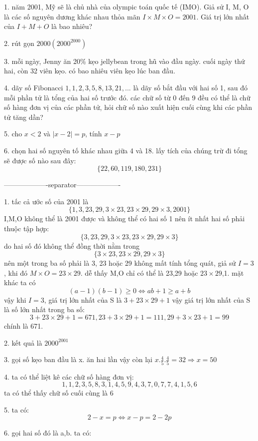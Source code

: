 \documentclass{article}
\begin{document}
1. năm 2001, Mỹ sẽ là chủ nhà của olympic toán quốc tế (IMO). 
Giả sử I, M, O là các số nguyên dương khác nhau thỏa mãn $I\times M \times O=2001$. 
Giá trị lớn nhất của $I+M+O$ là bao nhiêu?

2. rút gọn $2000(2000^{2000})$

3. mỗi ngày, Jenny ăn 20\% kẹo jellybean trong hũ vào đầu ngày. cuối ngày thứ hai, còn 32 viên kẹo.
có bao nhiêu viên kẹo lúc ban đầu.

4. dãy số Fibonacci $1,1,2,3,5,8,13,21,...$ là dãy số bắt đầu với hai số 1, sau đó mỗi phần tử là tổng của hai số trước đó.
các chữ số từ 0 đến 9 đều có thể là chữ số hàng đơn vị của các phần tử, hỏi chữ số nào xuất hiện cuối cùng khi các phần tử tăng dần?

5. cho $x<2$ và $|x-2|=p$, tính $x-p$

6. chọn hai số nguyên tố khác nhau giữa 4 và 18. lấy tích của chúng trừ đi tổng sẽ được số nào sau đây:
\[\{22,60,119,180,231\}\]

-------------------separator-------------------

1. tấc cả ước số của 2001 là
\[\{1, 3, 23, 29, 3\times 23, 23\times 29, 29\times 3, 2001\}\]
I,M,O không thể là 2001 được và không thể có hai số 1 nên ít nhất hai số phải thuộc tập hợp:
\[\{3, 23, 29, 3\times 23, 23\times 29, 29\times 3\}\]
do hai số đó không thể đồng thời nằm trong 
\[\{3\times 23, 23\times 29, 29\times 3\}\]
nên một trong ba số phải là 3, 23 hoặc 29
\newline
không mất tính tổng quát, giả sử $I=3$, khi đó $M\times O=23\times 29$.
dễ thấy M,O chỉ có thể là 23,29 hoặc $23\times 29$,1. mặt khác ta có
\[(a-1)(b-1)\geq 0 \Leftrightarrow ab+1 \geq a+b\]
vậy khi $I=3$, giá trị lớn nhất của S là $3+23\times 29 + 1$
vậy giá trị lớn nhất của S là số lớn nhất trong ba số:
\[3+23\times 29 + 1=671, 23 + 3 \times 29+1= 111, 29 + 3 \times 23+1=99\]
chính là 671.

2. kết quả là $2000^{2001}$

3. gọi số kẹo ban đầu là x. ăn hai lần vậy còn lại $x.\frac{4}{5}.\frac{4}{5}=32 \Rightarrow x=50$

4. ta có thể liệt kê các chữ số hàng đơn vị:
\[1,1,2,3,5,8,3,1,4,5,9,4,3,7,0,7,7,4,1,5,6\]
ta có thể thấy chữ số cuối cùng là 6

5. ta có:
\[2-x=p \Leftrightarrow x-p=2-2p\]







6. gọi hai số đó là a,b. ta có:
\[\]
\end{document}
